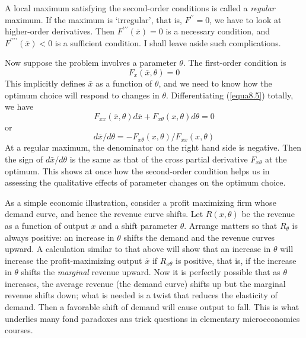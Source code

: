 A local maximum satisfying the second-order conditions is called a \textit{regular} maximum. If the maximum is `irregular', that is, $F^{\prime \prime}=0$, we have to look at higher-order derivatives. Then $F^{\prime \prime \prime}(\bar{x})=0$ is a necessary condition, and  $F^{\prime \prime \prime \prime}(\bar{x})<0$ is a sufficient condition. I shall leave aside such complications.

Now suppose the problem involves a parameter $\theta$. The first-order condition is 
\begin{equation} \label{equa8.5}
F_x (\bar{x}, \theta)=0
\end{equation}
This implicitly defines $\bar{x}$ as a function of $\theta$, and we need to know how the optimum choice will respond to changes in $\theta$. Differentiating (\ref{equa8.5}) totally, we have
\begin{equation*}
F_{xx}(\bar{x}, \theta) d\bar{x} + F_{x\theta}(x, \theta)d\theta =0
\end{equation*}
or
\begin{equation} \label{equa8.6}
d\bar{x} / d\theta = - F_{x\theta}(x,\theta)/ F_{xx}(x,\theta)
\end{equation}
At a regular maximum, the denominator on the right hand side is negative. Then the sign of $d\bar{x}/d\theta$ is the same as that of the cross partial derivative $F_{x\theta}$ at the optimum. This shows at once how the second-order condition helps us in assessing the qualitative effects of parameter changes on the optimum choice.

As a simple economic illustration, consider a profit maximizing firm whose demand curve, and hence the revenue curve shifts. Let $R(x, \theta)$ be the revenue as a function of output $x$ and a shift parameter $\theta$. Arrange matters so that $R_\theta$ is always positive: an increase in $\theta$ shifts the demand and the revenue curves upward. A  calculation similar to that above will show that an increase in $\theta$ will increase the profit-maximizing output $\bar{x}$ if $R_{x\theta}$ is positive, that is, if the increase in $\theta$ shifts the \textit{marginal} revenue upward. Now it is perfectly possible that as $\theta$ increases, the average revenue (the demand curve) shifts up but the marginal revenue shifts down; what is needed is a twist that reduces the elasticity of demand. Then a favorable shift of demand will cause output to fall. This is what underlies many fond paradoxes ans trick questions in elementary microeconomics courses.

